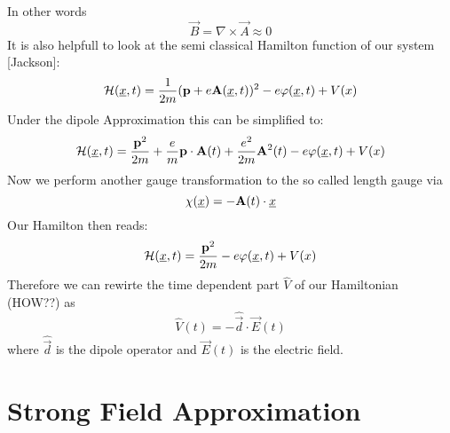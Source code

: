 In other words
\begin{equation*}
    \vec{B} = \nabla \times \vec{A} \approx 0
\end{equation*}
It is also helpfull to look at the semi classical Hamilton function of our system [Jackson]:
\begin{equation*}
    \mathcal{H}(\underline{x}, t) = \frac{1}{2m}(\mathbf{p} + e \mathbf{A}(\underline{x}, t))^2 - e \varphi(\underline{x}, t) + V(x)
\end{equation*}
Under the dipole Approximation this can be simplified to:
\begin{equation*}
    \mathcal{H}(\underline{x}, t) = \frac{\mathbf{p}^2}{2m} + \frac{e}{m}\mathbf{p}\cdot \mathbf{A}(t) + \frac{e^2}{2m}\mathbf{A}^2(t) - e \varphi(\underline{x}, t) + V(x)
\end{equation*}
Now we perform another gauge transformation to the so called length gauge via 
\begin{equation*}
    \chi(\underline{x}) = -\mathbf{A}(t)\cdot \underline{x}
\end{equation*}
Our Hamilton then reads:
\begin{equation*}
    \mathcal{H}(\underline{x}, t) = \frac{\mathbf{p}^2}{2m} - e \varphi(\underline{x}, t) + V(x)
\end{equation*}
Therefore we can rewirte the time dependent part $\hat{V}$ of our Hamiltonian (HOW??) as
\begin{equation}
    \hat{V}(t) = -\hat{\vec{d}} \cdot \vec{E}(t) \label{eq:dipoleApprox}
\end{equation}
where $\hat{\vec{d}}$ is the dipole operator and $\vec{E}(t)$ is the electric field.




\newpage
\section{Strong Field Approximation}

